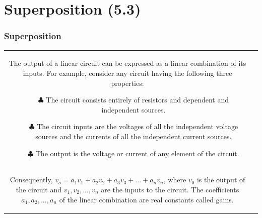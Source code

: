 \documentclass[aspectratio=169]{beamer}
\begin{document}
\section{Superposition (5.3)}
\begin{frame}[fragile]
\frametitle{Superposition}
		\begin{tabular}{cc}
			\begin{columns}
				\begin{column}{1\textwidth}  %
					The output of a linear circuit can be expressed as a linear combination of its inputs. For example,
consider any circuit having the following three properties:	
		
					\begin{itemize}
						\item[$\clubsuit$]{The circuit consists entirely of resistors and dependent and independent sources.}
						\item[$\clubsuit$] {The circuit inputs are the voltages of all the independent voltage sources and the currents of all the
independent current sources.}	
						\item[$\clubsuit$]{The output is the voltage or current of any element of the circuit.}	
		
					\end{itemize}
					
				\end{column}

			\end{columns} \\
			\begin{columns}
				\begin{column}{1\textwidth}  %
	{\newline  Consequently, $v_{o}=a_{1}v_{1}+a_{2}v_{2}+a_{3}v_{3}+...+a_{n}v_{n}$,
 where $v_{0}$ is the output of the circuit and $v_{1}, v_{2},..., v_{n}$ are the
inputs to the circuit. The coefficients $a_{1}, a_{2},..., a_{n}$ of the linear combination are real constants called gains.}		
				\end{column}

			\end{columns}




\end{tabular}




\end{frame}

\end{document}
